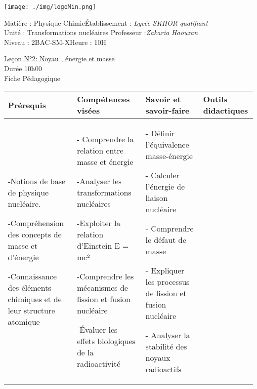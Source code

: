 \documentclass[13pt]{article}
\newcommand\headerMe[2]{\noindent{}#1\hfill#2}
\begin{document}
\begin{center}
\texttt{[image: ./img/logoMin.png]}
\vspace{-3cm}
\end{center}
\headerMe{Matière : Physique-Chimie}{Établissement : \emph{Lycée SKHOR qualifiant}}\\
\headerMe{ Unité :  Transformations nucléaires}{  Professeur :\emph{Zakaria Haouzan}}\\
\headerMe{Niveau : 2BAC-SM-X}{Heure : 10H}\\

\begin{center}
	\vspace{1cm}
\underline{Leçon N°2: Noyau , énergie et masse}\\
Durée 10h00
\\
    \vspace{.2cm}
\hrulefill
\Large{Fiche Pédagogique}
\hrulefill\\
\end{center}


 \begin{center}
	 \begin{tabular}{|p{}||p{}||p{}||p{}|}
\hline
\textbf{Prérequis} & \textbf{Compétences visées } & \textbf{Savoir et savoir-faire}&\textbf{Outils didactiques }\\
    \hline
    -Notions de base de physique nucléaire.

    -Compréhension des concepts de masse et d'énergie

-Connaissance des éléments chimiques et de leur structure atomique
				   
           &
         - Comprendre la relation entre masse et énergie
         
-Analyser les transformations nucléaires

-Exploiter la relation d'Einstein E = mc²

-Comprendre les mécanismes de fission et fusion nucléaire

-Évaluer les effets biologiques de la radioactivité  
				 
 & 
- Définir l'équivalence masse-énergie

- Calculer l'énergie de liaison nucléaire

- Comprendre le défaut de masse

- Expliquer les processus de fission et fusion nucléaire

- Analyser la stabilité des noyaux radioactifs

 & 


     \\
    \hline
\end{tabular} 
\end{center}
\end{document}
